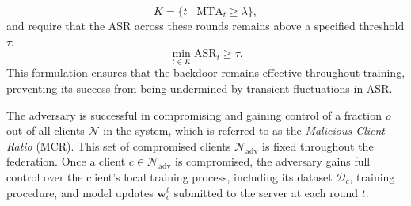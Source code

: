 \begin{equation}
    K = \{t \mid \text{MTA}_t \geq \lambda\},
\end{equation}  
and require that the ASR across these rounds remains above a specified threshold \(\tau\):  
\begin{equation}
    \min_{t \in K} \text{ASR}_t \geq \tau.
\end{equation}  
This formulation ensures that the backdoor remains effective throughout training, preventing its success from being undermined by transient fluctuations in ASR.

The adversary is successful in compromising and gaining control of a fraction $\rho$ out of all clients \(\mathcal{N}\) in the system, which is referred to as the \textit{Malicious Client Ratio} (MCR). This set of compromised clients $\mathcal{N}_\text{adv}$ is fixed throughout the federation.
Once a client \(c \in \mathcal{N}_\text{adv}\) is compromised, the adversary gains full control over the client’s local training process, including its dataset \(\mathcal{D}_c\), training procedure, and model updates \(\mathbf{w}_c^t\) submitted to the server at each round \(t\). 

